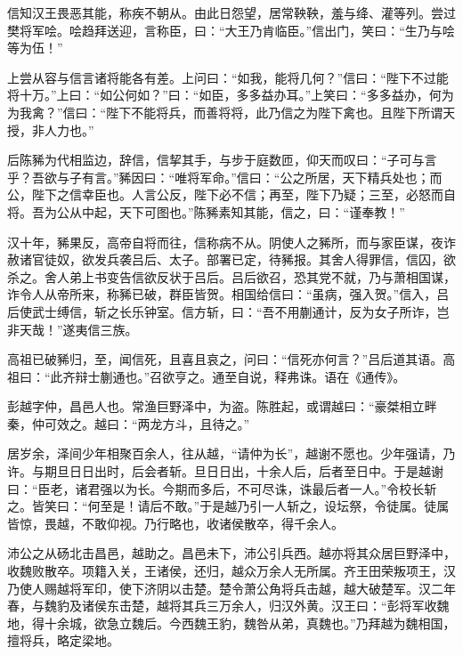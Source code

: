 \documentclass[12pt,UTF8]{ctexbook}
\begin{document}
信知汉王畏恶其能，称疾不朝从。由此日怨望，居常鞅鞅，羞与绛、灌等列。尝过樊将军哙。哙趋拜送迎，言称臣，曰：“大王乃肯临臣。”信出门，笑曰：“生乃与哙等为伍！”



上尝从容与信言诸将能各有差。上问曰：“如我，能将几何？”信曰：“陛下不过能将十万。”上曰：“如公何如？”曰：“如臣，多多益办耳。”上笑曰：“多多益办，何为为我禽？”信曰：“陛下不能将兵，而善将将，此乃信之为陛下禽也。且陛下所谓天授，非人力也。”



后陈豨为代相监边，辞信，信挈其手，与步于庭数匝，仰天而叹曰：“子可与言乎？吾欲与子有言。”豨因曰：“唯将军命。”信曰：“公之所居，天下精兵处也；而公，陛下之信幸臣也。人言公反，陛下必不信；再至，陛下乃疑；三至，必怒而自将。吾为公从中起，天下可图也。”陈豨素知其能，信之，曰：“谨奉教！”



汉十年，豨果反，高帝自将而往，信称病不从。阴使人之豨所，而与家臣谋，夜诈赦诸官徒奴，欲发兵袭吕后、太子。部署已定，待豨报。其舍人得罪信，信囚，欲杀之。舍人弟上书变告信欲反状于吕后。吕后欲召，恐其党不就，乃与萧相国谋，诈令人从帝所来，称豨已破，群臣皆贺。相国给信曰：“虽病，强入贺。”信入，吕后使武士缚信，斩之长乐钟室。信方斩，曰：“吾不用蒯通计，反为女子所诈，岂非天哉！”遂夷信三族。



高祖已破豨归，至，闻信死，且喜且哀之，问曰：“信死亦何言？”吕后道其语。高祖曰：“此齐辩士蒯通也。”召欲亨之。通至自说，释弗诛。语在《通传》。



彭越字仲，昌邑人也。常渔巨野泽中，为盗。陈胜起，或谓越曰：“豪桀相立畔秦，仲可效之。越曰：“两龙方斗，且待之。”



居岁余，泽间少年相聚百余人，往从越，“请仲为长”，越谢不愿也。少年强请，乃许。与期旦日日出时，后会者斩。旦日日出，十余人后，后者至日中。于是越谢曰：“臣老，诸君强以为长。今期而多后，不可尽诛，诛最后者一人。”令校长斩之。皆笑曰：“何至是！请后不敢。”于是越乃引一人斩之，设坛祭，令徒属。徒属皆惊，畏越，不敢仰视。乃行略也，收诸侯散卒，得千余人。



沛公之从砀北击昌邑，越助之。昌邑未下，沛公引兵西。越亦将其众居巨野泽中，收魏败散卒。项籍入关，王诸侯，还归，越众万余人无所属。齐王田荣叛项王，汉乃使人赐越将军印，使下济阴以击楚。楚令萧公角将兵击越，越大破楚军。汉二年春，与魏豹及诸侯东击楚，越将其兵三万余人，归汉外黄。汉王曰：“彭将军收魏地，得十余城，欲急立魏后。今西魏王豹，魏咎从弟，真魏也。”乃拜越为魏相国，擅将兵，略定梁地。
\end{document}

